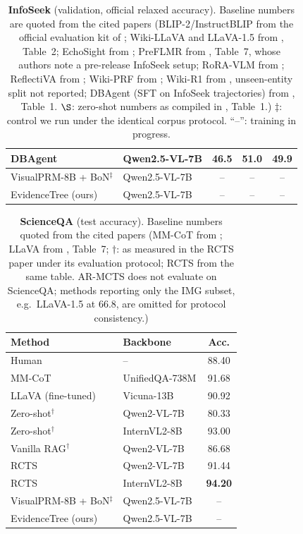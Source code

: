 \documentclass[letterpaper,twocolumn,10pt]{article}
\newcommand{\ours}{EvidenceTree}
\newcommand{\NA}{--}          %
\newcommand{\best}[1]{\textbf{#1}}
\begin{document}
\begin{table}[t]
\begin{tabular}{@{}llccc@{}}
DBAgent \cite{chen2026learningtosearch} & Qwen2.5-VL-7B & 46.5 & \best{51.0} & \best{49.9} \\
\midrule
VisualPRM-8B + BoN$^\ddagger$ & Qwen2.5-VL-7B & \NA & \NA & \NA \\
\ours{} (ours) & Qwen2.5-VL-7B & \NA & \NA & \NA \\
\bottomrule
\end{tabular}
\caption{\textbf{InfoSeek} (validation, official relaxed accuracy).
Baseline numbers are quoted from the cited papers (BLIP-2/InstructBLIP
from the official evaluation kit of \citealt{chen2023infoseek}; Wiki-LLaVA
and LLaVA-1.5 from \citealt{caffagni2024wikillava}, Table~2; EchoSight
from \citealt{yan2024echosight}; PreFLMR from \citealt{lin2024preflmr},
Table~7, whose authors note a pre-release InfoSeek setup; RoRA-VLM from
\citealt{qi2024roravlm}; ReflectiVA from \citealt{cocchi2025reflectiva};
Wiki-PRF from \citealt{hong2025wikiprf}; Wiki-R1 from
\citealt{wikir12026}, unseen-entity split not reported; DBAgent (SFT on
InfoSeek trajectories) from \citealt{chen2026learningtosearch}, Table~1.
$\S$: zero-shot numbers as compiled in \citealt{chen2026learningtosearch},
Table~1.) $\ddagger$: control we run under the identical corpus protocol.
``\NA'': training in progress.}
\label{tab:infoseek}
\end{table}

\begin{table}[t]
\centering\small
\setlength{\tabcolsep}{4pt}
\begin{tabular}{@{}llc@{}}
\toprule
Method & Backbone & Acc. \\
\midrule
Human \cite{lu2022scienceqa} & -- & 88.40 \\
MM-CoT \cite{zhang2023mmcot} & UnifiedQA-738M & 91.68 \\
LLaVA (fine-tuned) \cite{liu2023visualinstruction} & Vicuna-13B & 90.92 \\
Zero-shot$^{\dagger}$ & Qwen2-VL-7B & 80.33 \\
Zero-shot$^{\dagger}$ & InternVL2-8B & 93.00 \\
Vanilla RAG$^{\dagger}$ & Qwen2-VL-7B & 86.68 \\
RCTS \cite{rcts2025} & Qwen2-VL-7B & 91.44 \\
RCTS \cite{rcts2025} & InternVL2-8B & \best{94.20} \\
\midrule
VisualPRM-8B + BoN$^\ddagger$ & Qwen2.5-VL-7B & \NA \\
\ours{} (ours) & Qwen2.5-VL-7B & \NA \\
\bottomrule
\end{tabular}
\caption{\textbf{ScienceQA} (test accuracy). Baseline numbers quoted from
the cited papers (MM-CoT from \citealt{zhang2023mmcot}; LLaVA from
\citealt{liu2023visualinstruction}, Table~7; $\dagger$: as measured in the
RCTS paper \citealt{rcts2025} under its evaluation protocol; RCTS from the
same table. AR-MCTS \citealt{dong2025armcts} does not evaluate on
ScienceQA; methods reporting only the IMG subset, e.g.\ LLaVA-1.5 at 66.8,
are omitted for protocol consistency.)}
\label{tab:scienceqa}
\end{table}
\end{document}
